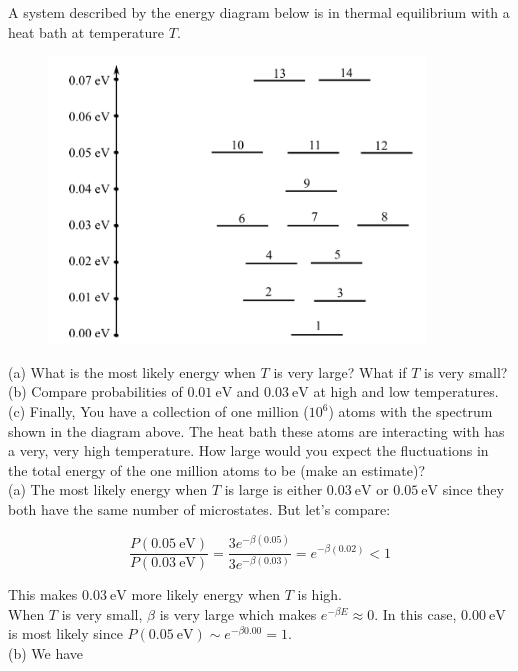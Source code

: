 \documentclass[12pt, a4paper]{article}
\newcounter{exa}
\begin{document}
\begin{texample}
A system described by the energy diagram below is in thermal equilibrium with a heat bath at temperature $T$.

\begin{figure}[H]
\centering
\includegraphics[width=100mm]{28.png}
\end{figure}

(a) What is the most likely energy when $T$ is very large? What if $T$ is very small? (b) Compare probabilities of $\SI{0.01}{\electronvolt}$ and $\SI{0.03}{\electronvolt}$ at high and low temperatures. (c) Finally, You have a collection of one million ($10^6$) atoms with the spectrum shown in the diagram above. The heat bath these atoms are interacting with has a very, very high temperature.  How large would you expect the fluctuations in the total energy of the one million atoms to be (make an estimate)? \\

(a) The most likely energy when $T$ is large is either $\SI{0.03}{\electronvolt}$ or $\SI{0.05}{\electronvolt}$ since they both have the same number of microstates. But let's compare:

\[ \frac{P(\SI{0.05}{\electronvolt})}{P(\SI{0.03}{\electronvolt})} = \frac{3e^{-\beta(0.05)}}{3e^{-\beta(0.03)}} = e^{-\beta(0.02)} < 1 \]

This makes $\SI{0.03}{\electronvolt}$ more likely energy when $T$ is high. \\

When $T$ is very small, $\beta$ is very large which makes $e^{-\beta E} \approx 0$. In this case, $\SI{0.00}{\electronvolt}$ is most likely since $P(\SI{0.05}{\electronvolt})\sim e^{-\beta 0.00}=1$. \\

(b) We have


\end{texample}
\end{document}
